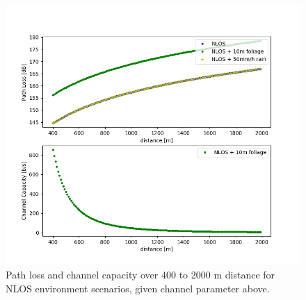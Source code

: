 \begin{figure}[htb]
    \begin{center}
    \includegraphics[width=0.9\linewidth]{smba_sim_3}
        \caption{Path loss and channel capacity over 400 to 2000 m distance for NLOS  environment scenarios, 
        given channel parameter above.}
        \label{fig:sim_3}
    \end{center}
\end{figure}

